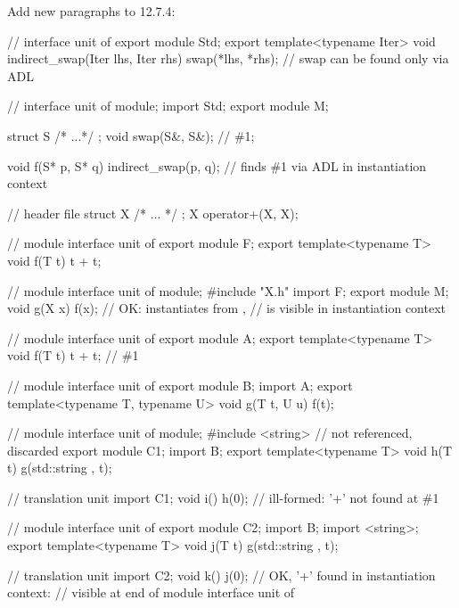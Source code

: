 \noindent
Add new paragraphs to 12.7.4:
\begin{std.txt}
\color{addclr}
\alinea
\enterexample
\begin{codeblock}
// interface unit of 
export module Std;
export template<typename Iter>
void indirect_swap(Iter lhs, Iter rhs)
{
  swap(*lhs, *rhs);     // swap can be found only via ADL
}

// interface unit of 
module;
import Std;
export module M;

struct S { /* ...*/ };
void swap(S&, S&);      // \#1;

void f(S* p, S* q)
{
  indirect_swap(p, q);  // finds \#1 via ADL in instantiation context
}
\end{codeblock}
\exitexample

\alinea
\enterexample
\begin{codeblock}
// header file 
struct X { /* ... */ };
X operator+(X, X);

// module interface unit of 
export module F;
export template<typename T>
void f(T t) {
  t + t;
}

// module interface unit of 
module;
#include "X.h"
import F;
export module M;
void g(X x) {
  f(x);             // OK: instantiates  from ,
                    //  is visible in instantiation context
}
\end{codeblock}
\exitexample

\alinea
\enterexample
\begin{codeblock}
// module interface unit of 
export module A;
export template<typename T>
void f(T t) {
  t + t;           // \#1
}

// module interface unit of 
export module B;
import A;
export template<typename T, typename U>
void g(T t, U u) {
  f(t);
}

// module interface unit of 
module;
#include <string>   //  not referenced, discarded
export module C1;
import B;
export template<typename T>
void h(T t) {
  g(std::string{ }, t);
}

// translation unit
import C1;
void i() {
   h(0);        // ill-formed: '+' not found at \#1
}

// module interface unit of 
export module C2;
import B;
import <string>;
export template<typename T>
void j(T t) {
  g(std::string{ }, t);
}

// translation unit
import C2;
void k() {
   j(0);        // OK, '+' found in instantiation context:
                // visible at end of module interface unit of 
}
\end{codeblock}
\exitexample
\end{std.txt}

